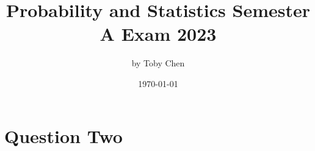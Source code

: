 \documentclass{article}
\title{Probability and Statistics Semester A Exam 2023}
\author{by Toby Chen}
\date{\today}
\begin{document}
    \maketitle

    \tableofcontents

    \section{Question Two}
        
\end{document}

